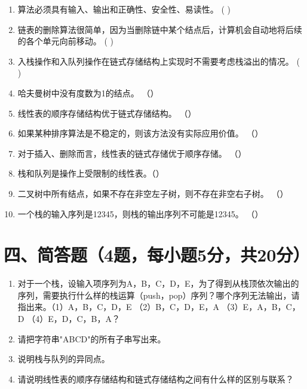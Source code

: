 \documentclass{../../note}
\begin{document}
\begin{enumerate}
\item 算法必须具有输入、输出和正确性、安全性、易读性。 ( \hspace{0.5cm} )

\item 链表的删除算法很简单，因为当删除链中某个结点后，计算机会自动地将后续的各个单元向前移动。 ( \hspace{0.5cm} )

\item 入栈操作和入队列操作在链式存储结构上实现时不需要考虑栈溢出的情况。 ( \hspace{0.5cm} )

\item 哈夫曼树中没有度数为1的结点。 （\hspace{0.5cm}）

\item 线性表的顺序存储结构优于链式存储结构。 （\hspace{0.5cm}）

\item 如果某种排序算法是不稳定的，则该方法没有实际应用价值。 （\hspace{0.5cm}）

\item 对于插入、删除而言，线性表的链式存储优于顺序存储。 （\hspace{0.5cm}）

\item 栈和队列是操作上受限制的线性表。（\hspace{0.5cm}）

\item 二叉树中所有结点，如果不存在非空左子树，则不存在非空右子树。 （\hspace{0.5cm}）

\item 一个栈的输入序列是12345，则栈的输出序列不可能是12345。 （\hspace{0.5cm}）
\end{enumerate}

\vspace{1cm}

\section*{四、简答题（4题，每小题5分，共20分）}

\begin{enumerate}
\item 对于一个栈，设输入项序列为A，B，C，D，E，为了得到从栈顶依次输出的序列，需要执行什么样的栈运算（push，pop）序列？哪个序列无法输出，请指出来。（1）A，B，C，D，E （2）B，C，D，E，A （3）E，A，B，C，D （4）E，D，C，B，A？

\item 请把字符串"ABCD"的所有子串写出来。

\item 说明栈与队列的异同点。

\item 请说明线性表的顺序存储结构和链式存储结构之间有什么样的区别与联系？
\end{enumerate}
\end{document}
